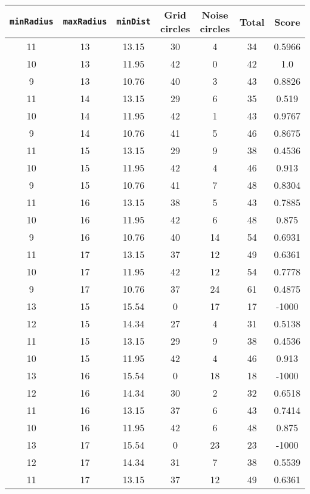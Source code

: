 \documentclass[letterpaper, 12pt]{article}
\begin{document}
\begin{longtable}{|c|c|c|c|c|c|c|}
\hline
\textbf{\texttt{minRadius}} & \textbf{\texttt{maxRadius}} & \textbf{\texttt{minDist}} & \textbf{Grid circles} & \textbf{Noise circles} & \textbf{Total} & \textbf{Score} \\
\hline
11 & 13 & 13.15 & 30 & 4 & 34 & 0.5966 \\
\hline
10 & 13 & 11.95 & 42 & 0 & 42 & 1.0 \\
\hline
9 & 13 & 10.76 & 40 & 3 & 43 & 0.8826 \\
\hline
11 & 14 & 13.15 & 29 & 6 & 35 & 0.519 \\
\hline
10 & 14 & 11.95 & 42 & 1 & 43 & 0.9767 \\
\hline
9 & 14 & 10.76 & 41 & 5 & 46 & 0.8675 \\
\hline
11 & 15 & 13.15 & 29 & 9 & 38 & 0.4536 \\
\hline
10 & 15 & 11.95 & 42 & 4 & 46 & 0.913 \\
\hline
9 & 15 & 10.76 & 41 & 7 & 48 & 0.8304 \\
\hline
11 & 16 & 13.15 & 38 & 5 & 43 & 0.7885 \\
\hline
10 & 16 & 11.95 & 42 & 6 & 48 & 0.875 \\
\hline
9 & 16 & 10.76 & 40 & 14 & 54 & 0.6931 \\
\hline
11 & 17 & 13.15 & 37 & 12 & 49 & 0.6361 \\
\hline
10 & 17 & 11.95 & 42 & 12 & 54 & 0.7778 \\
\hline
9 & 17 & 10.76 & 37 & 24 & 61 & 0.4875 \\
\hline
13 & 15 & 15.54 & 0 & 17 & 17 & -1000 \\
\hline
12 & 15 & 14.34 & 27 & 4 & 31 & 0.5138 \\
\hline
11 & 15 & 13.15 & 29 & 9 & 38 & 0.4536 \\
\hline
10 & 15 & 11.95 & 42 & 4 & 46 & 0.913 \\
\hline
13 & 16 & 15.54 & 0 & 18 & 18 & -1000 \\
\hline
12 & 16 & 14.34 & 30 & 2 & 32 & 0.6518 \\
\hline
11 & 16 & 13.15 & 37 & 6 & 43 & 0.7414 \\
\hline
10 & 16 & 11.95 & 42 & 6 & 48 & 0.875 \\
\hline
13 & 17 & 15.54 & 0 & 23 & 23 & -1000 \\
\hline
12 & 17 & 14.34 & 31 & 7 & 38 & 0.5539 \\
\hline
11 & 17 & 13.15 & 37 & 12 & 49 & 0.6361 \\
\hline

\end{longtable}
\end{document}
